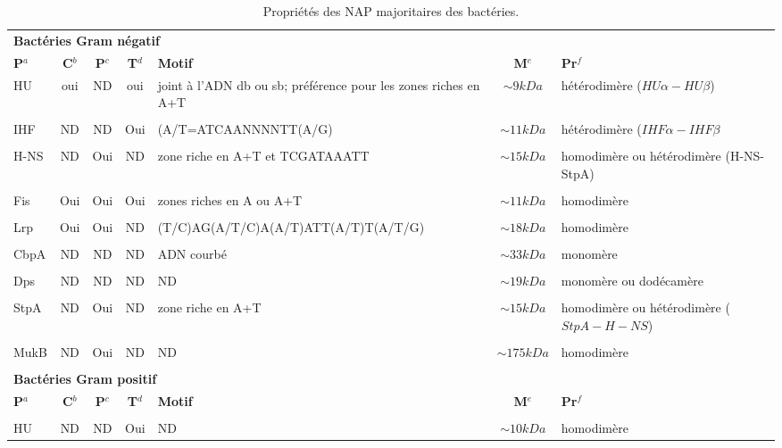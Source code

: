 \begin{table}[H]
	\hspace{-1.5cm}
	\caption[Propriétés des NAP majoritaires des bactéries]{Propriétés des NAP majoritaires des bactéries.}\label{tabnap2}
	\small 
	\begin{tabular}[left]{lcccp{}cp{}}
	\multicolumn{6}{l}{\textbf{Bactéries Gram négatif}}\\
	\textbf{P}$^{a}$ & \textbf{C}$^{b}$ & \textbf{P}$^{c}$ & \textbf{T}$^{d}$ & \textbf{Motif} & \textbf{M}$^{e}$ & \textbf{Pr}$^{f}$\\
	\hline
	HU & oui & ND & oui & joint à l'ADN db ou sb; préférence pour les zones riches en A+T & $\sim9kDa$ & hétérodimère ($HU\alpha-HU\beta$)\\
	\\[-0.2cm]
	IHF & ND & ND & Oui & (A/T=ATCAANNNNTT(A/G) & $\sim11kDa$ & hétérodimère ($IHF\alpha-IHF\beta$\\
	\\[-0.2cm]
	H-NS & ND & Oui & ND & zone riche en A+T et TCGATAAATT & $\sim15kDa$ & homodimère ou hétérodimère (H-NS-StpA)\\
	\\[-0.2cm]
	Fis & Oui & Oui & Oui & zones riches en A ou A+T & $\sim11kDa$ & homodimère\\
	\\[-0.2cm]
	Lrp & Oui & Oui & ND & (T/C)AG(A/T/C)A(A/T)ATT(A/T)T(A/T/G) & $\sim18kDa$ & homodimère\\
	\\[-0.2cm]
	CbpA & ND & ND & ND & ADN courbé & $\sim33kDa$ & monomère\\
	\\[-0.2cm]
	Dps & ND & ND & ND & ND & $\sim19kDa$ & monomère ou dodécamère\\
	\\[-0.2cm]
	StpA & ND & Oui & ND & zone riche en A+T & $\sim15kDa$ & homodimère ou hétérodimère ($StpA-H-NS$)\\
	\\[-0.2cm]
	MukB & ND & Oui & ND & ND & $\sim175kDa$ & homodimère\\
	\\[-0.4cm]
	\multicolumn{6}{l}{\textbf{Bactéries Gram positif}}\\
	\textbf{P}$^{a}$ & \textbf{C}$^{b}$ & \textbf{P}$^{c}$ & \textbf{T}$^{d}$ & \textbf{Motif} & \textbf{M}$^{e}$ & \textbf{Pr}$^{f}$\\
	\hline
	\\[-0.2cm]
	HU & ND & ND & Oui & ND & $\sim10kDa$ & homodimère\\

\end{tabular}
\end{table}
